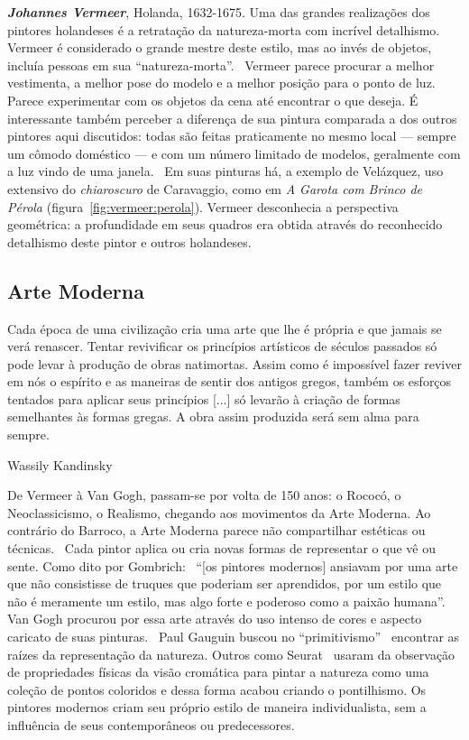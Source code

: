 \textbf{\emph{Johannes Vermeer}}, Holanda, 1632-1675. Uma das grandes realizações dos
pintores holandeses é a retratação da natureza-morta com incrível
detalhismo.~\cite{wadum} Vermeer é considerado o grande mestre deste
estilo, mas ao invés de objetos, incluía pessoas em sua
``natureza-morta''.~\cite{gombrich} Vermeer parece procurar a melhor
vestimenta, a melhor pose do modelo e a melhor posição para o ponto de
luz. Parece experimentar com os objetos da cena até encontrar o que
deseja. É interessante também perceber a diferença de sua pintura
comparada a dos outros pintores aqui discutidos: todas são feitas
praticamente no mesmo local --- sempre um cômodo doméstico --- e com
um número limitado de modelos, geralmente com a luz vindo de uma
janela.~\cite{wadum}  Em suas pinturas há, a exemplo de Velázquez,
uso extensivo do \textit{chiaroscuro} de Caravaggio, como em \textit{A
Garota com Brinco de Pérola}
(figura~\ref{fig:vermeer:perola}). Vermeer desconhecia a perspectiva
geométrica: a profundidade em seus quadros era obtida através do
reconhecido detalhismo deste pintor e outros holandeses.



\subsection{Arte Moderna}

\setlength{\epigraphwidth}{0.8\textwidth}
\epigraph{Cada época de uma civilização cria uma arte que lhe é própria e que
  jamais se verá renascer. Tentar revivificar os princípios artísticos de
  séculos passados só pode levar à produção de obras natimortas. Assim como é
  impossível fazer reviver em nós o espírito e as maneiras de sentir dos antigos
  gregos, também os esforços tentados para aplicar seus princípios [...] só
  levarão à criação de formas semelhantes às formas gregas. A obra assim
  produzida será sem alma para sempre.}{Wassily Kandinsky~\cite{kandinsky}}

De Vermeer à Van Gogh, passam-se por volta de 150 anos: o Rococó, o
Neoclassicismo, o Realismo, chegando aos movimentos da Arte
Moderna. Ao contrário do Barroco, a Arte Moderna parece não
compartilhar estéticas ou técnicas.~\cite{dempsey} Cada pintor aplica
ou cria novas formas de representar o que vê ou sente. Como dito por
Gombrich:~\cite{gombrich} ``[os pintores modernos] ansiavam por uma
arte que não consistisse de truques que poderiam ser aprendidos, por
um estilo que não é meramente um estilo, mas algo forte e poderoso
como a paixão humana''. Van Gogh procurou por essa arte através do uso
intenso de cores e aspecto caricato de suas pinturas.~\cite{hulsker}
Paul Gauguin buscou no ``primitivismo''~\cite{lovejoy} encontrar as
raízes da representação da natureza. Outros como Seurat~\cite{kemp}
usaram da observação de propriedades físicas da visão cromática para
pintar a natureza como uma coleção de pontos coloridos e dessa forma
acabou criando o pontilhismo. Os pintores modernos criam seu próprio
estilo de maneira individualista, sem a influência de seus
contemporâneos ou predecessores.~\cite{gombrich}

